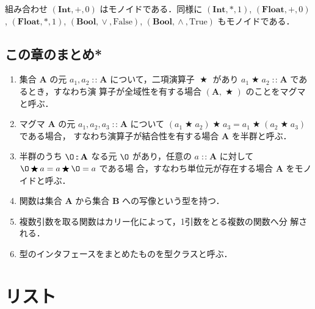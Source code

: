 \documentclass[a5paper,twoside,fleqn,draft]{jsbook}
\newcommand{\programminglanguage}[1]{\textsf{#1}}
\newcommand{\haskell}{\programminglanguage{Haskell}}
\newcommand{\code}[1]{\texttt{#1}}
\newcommand{\mSpecialConstant}[1]{\textrm{#1}}
\newcommand{\mFalse}{\mSpecialConstant{False}}
\newcommand{\mTrue}{\mSpecialConstant{True}}
\newcommand{\mZero}{\O}
\DeclareMathOperator{\mBinOp}{\bigstar}
\DeclareMathOperator{\mIn}{{:\!:}}
\DeclareMathOperator{\mLogicalAnd}{\wedge}
\DeclareMathOperator{\mLogicalOr}{\vee}
\DeclareMathOperator{\mPlus}{\boldmath{+}} %
\newcommand{\mSet}[1]{\mathbf{#1}}
\newcommand{\mType}[1]{\mathbf{#1}} %
\newcommand{\mA}{\mType{a}}
\newcommand{\mBoolType}{\mType{Bool}}
\newcommand{\mFloatType}{\mType{Float}}
\newcommand{\mIntType}{\mType{Int}}
\newcommand{\mTupleWith}[1]{\left(#1\right)} %
\newcommand{\mTypeClass}[1]{\textsc{#1}} %
\newcommand{\mMonoidTypeClass}{\mTypeClass{Monoid}}
\begin{document}
組み合わせ $(\mIntType,+,0)$ はモノイドである．同様に
$(\mIntType,*,1)$, $(\mFloatType,+,0)$, $(\mFloatType,*,1)$,
$(\mBoolType,\mLogicalOr,\mFalse)$, $(\mBoolType,\mLogicalAnd,\mTrue)$
もモノイドである．


\section{この章のまとめ*}

\begin{enumerate}
\item 集合 $\mSet{A}$ の元 $a_1,a_2\mIn\mSet{A}$ について，二項演算子
  $\mBinOp$ があり $a_1\mBinOp a_2\mIn\mSet{A}$ であるとき，すなわち演
  算子が全域性を有する場合 $(\mSet{A},\mBinOp)$ のことをマグマと呼ぶ．
\item マグマ $\mSet{A}$ の元 $a_1,a_2,a_3\mIn\mSet{A}$ について
  $(a_1\mBinOp a_2)\mBinOp a_3=a_1\mBinOp(a_2\mBinOp a_3)$ である場合，
  すなわち演算子が結合性を有する場合 $\mSet{A}$ を半群と呼ぶ．
\item 半群のうち $\mZero\mIn\mSet{A}$ なる元 $\mZero$ があり，任意の
  $a\mIn\mSet{A}$ に対して $\mZero\mBinOp a=a\mBinOp\mZero=a$ である場
  合，すなわち単位元が存在する場合 $\mSet{A}$ をモノイドと呼ぶ．
\item 関数は集合 $\mSet{A}$ から集合 $\mSet{B}$ への写像という型を持つ．
\item 複数引数を取る関数はカリー化によって，1引数をとる複数の関数へ分
  解される．
\item 型のインタフェースをまとめたものを型クラスと呼ぶ．
\end{enumerate}

\chapter{リスト}
\label{ch:list}
\end{document}
